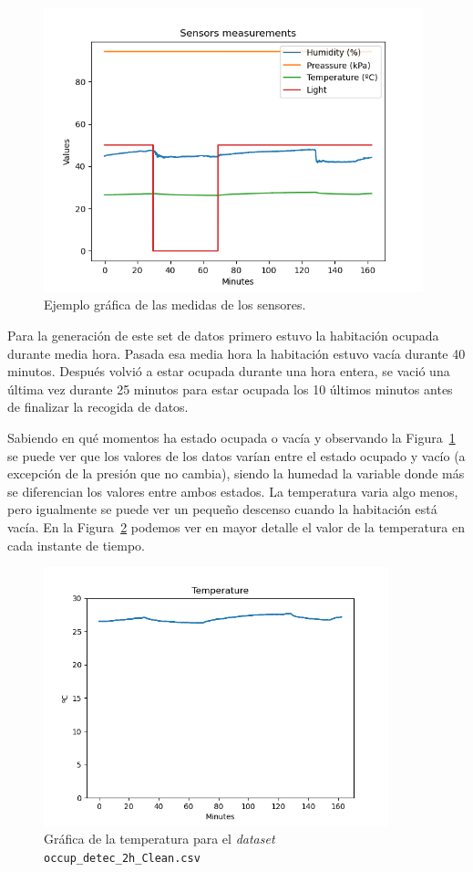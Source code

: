 \documentclass[a4paper, 12pt]{book}
\begin{document}
\begin{figure}[]
  \centering
  \includegraphics[width=11cm, keepaspectratio]{img/Data_occup_detec_2h_original.png}
  \caption{Ejemplo gráfica de las medidas de los sensores.}\label{fig:ejemplo_gráfica}
\end{figure}

Para la generación de este set de datos primero estuvo la habitación ocupada durante media hora. Pasada esa media hora la habitación estuvo vacía durante 40 minutos. Después volvió a estar ocupada durante una hora entera, se vació una última vez durante 25 minutos para estar ocupada los 10 últimos minutos antes de finalizar la recogida de datos.

Sabiendo en qué momentos ha estado ocupada o vacía y observando la Figura~\ref{fig:ejemplo_gráfica} se puede ver que los valores de los datos varían entre el estado ocupado y vacío (a excepción de la presión que no cambia), siendo la humedad la variable donde más se diferencian los valores entre ambos estados. La temperatura varia algo menos, pero igualmente se puede ver un pequeño descenso cuando la habitación está vacía. En la Figura~\ref{fig:graf_temp} podemos ver en mayor detalle el valor de la temperatura en cada instante de tiempo.

\begin{figure}[]
  \centering
  \includegraphics[width=10cm, keepaspectratio]{img/Temp_occup_detec_2h_original.png}
  \caption{Gráfica de la temperatura para el \textit{dataset} \texttt{occup\_detec\_2h\_Clean.csv}}\label{fig:graf_temp}
\end{figure}
\end{document}

